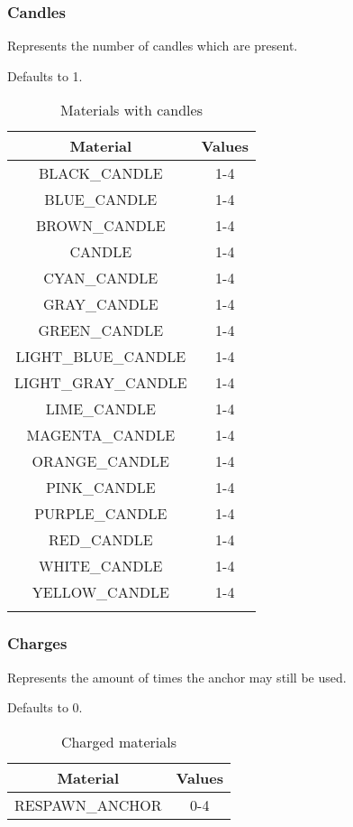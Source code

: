\subsubsection{Candles}
Represents the number of candles which are present.

Defaults to 1.


\begin{longtable}{ |c|c| }
	\hline
	Material & Values \\
	\hline
	\endhead
	BLACK\_CANDLE & 1-4 \\
	BLUE\_CANDLE & 1-4 \\
	BROWN\_CANDLE & 1-4 \\
	CANDLE & 1-4 \\
	CYAN\_CANDLE & 1-4 \\
	GRAY\_CANDLE & 1-4 \\
	GREEN\_CANDLE & 1-4 \\
	LIGHT\_BLUE\_CANDLE & 1-4 \\
	LIGHT\_GRAY\_CANDLE & 1-4 \\
	LIME\_CANDLE & 1-4 \\
	MAGENTA\_CANDLE & 1-4 \\
	ORANGE\_CANDLE & 1-4 \\
	PINK\_CANDLE & 1-4 \\
	PURPLE\_CANDLE & 1-4 \\
	RED\_CANDLE & 1-4 \\
	WHITE\_CANDLE & 1-4 \\
	YELLOW\_CANDLE & 1-4 \\
	\hline
	\caption{Materials with candles}
\end{longtable}

\subsubsection{Charges}
Represents the amount of times the anchor may still be used.

Defaults to 0.

\begin{table}[H]
	\centering
	\begin{tabular}{ |c|c| }
		\hline
		Material & Values \\
		\hline
		RESPAWN\_ANCHOR & 0-4 \\
		\hline
	\end{tabular}
	\caption{Charged materials}
\end{table}

